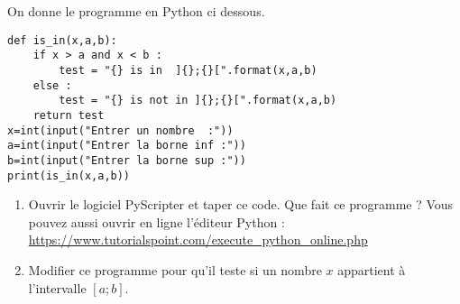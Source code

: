 
On donne le programme en Python ci dessous. 
 
\begin{lstlisting}
def is_in(x,a,b):
    if x > a and x < b :
    	test = "{} is in  ]{};{}[".format(x,a,b) 
    else :
        test = "{} is not in ]{};{}[".format(x,a,b) 
    return test    
x=int(input("Entrer un nombre  :")) 
a=int(input("Entrer la borne inf :"))
b=int(input("Entrer la borne sup :"))    
print(is_in(x,a,b))
\end{lstlisting}
 


\begin{enumerate}
\item Ouvrir le logiciel PyScripter et taper ce code. Que fait ce programme ? Vous pouvez aussi ouvrir en ligne l'éditeur Python : \url{https://www.tutorialspoint.com/execute_python_online.php}
\item Modifier ce programme pour qu'il teste si un nombre $x$ appartient à l'intervalle $[a;b]$.
\end{enumerate}